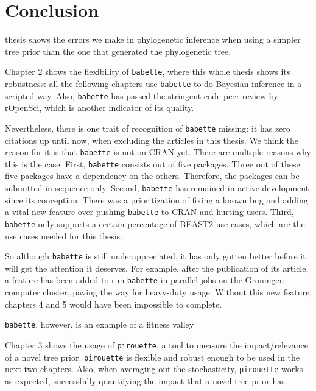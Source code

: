 \chapter{Conclusion}
\label{conclusion}

\newpage

\noindent 
{} thesis shows the errors we make in phylogenetic inference
when using a simpler tree prior than the one that generated the phylogenetic
tree.

Chapter 2 shows the flexibility of \verb;babette;, where this whole thesis
shows its robustness: all the following chapters use \verb;babette; to
do Bayesian inference in a scripted way. Also, \verb;babette; has passed
the stringent code peer-review by rOpenSci, which is another indicator of 
its quality.

Nevertheless, there is one trait of recognition of \verb;babette; missing:
it has zero citations up until now, when excluding the articles in this 
thesis. We think the reason for it is that \verb;babette; is
not on CRAN yet. There are multiple reasons why this is the case:
First, \verb;babette; consists out of five packages. Three out of these
five packages have a dependency on the others. Therefore, the packages can
be submitted in sequence only. Second, \verb;babette; has remained in active 
development since its conception. There was a prioritization of 
fixing a known bug and adding a vital new feature over 
pushing \verb;babette; to CRAN and hurting users. Third, \verb;babette;
only supports a certain percentage of BEAST2 use cases, which are the
use cases needed for this thesis. 

So although \verb;babette; is still underappreciated, it has only gotten
better before it will get the attention it deserves. 
For example, after the publication of its article, 
a feature has been added to run \verb;babette; in parallel
jobs on the Groningen computer cluster, paving the way for heavy-duty 
usage. Without this new feature, chapters 4 and 5 would have been
impossible to complete.

\verb;babette;, however, is an example of a fitness valley

Chapter 3 shows the usage of \verb;pirouette;, a tool to measure the
impact/relevance of a novel tree prior. \verb;pirouette; is flexible and
robust enough to be used in the next two chapters. Also, when averaging
out the stochasticity, \verb;pirouette; works as expected, successfully
quantifying the impact that a novel tree prior has.

